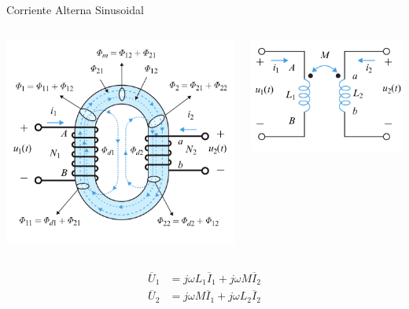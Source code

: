 \documentclass[xcolor={usenames,svgnames,dvipsnames}]{beamer}
\begin{document}
\begin{frame}[label={sec:org409ff05}]{Corriente Alterna Sinusoidal}
\begin{columns}
\begin{column}{0.5\columnwidth}
\begin{center}
\includegraphics[height=0.45\textheight]{figs/Acoplamiento1.png}
\end{center}
\end{column}

\begin{column}{0.5\columnwidth}
\begin{center}
\includegraphics[height=0.45\textheight]{figs/Acoplamiento1_circuito.png}
\end{center}
\end{column}
\end{columns}
\begin{align*}
  \overline{U}_1 &= j \omega L_1 \overline{I}_1 + j \omega M \overline{I}_2\\
  \overline{U}_2 &= j \omega M \overline{I}_1 + j \omega L_2 \overline{I}_2
\end{align*}
\end{frame}
\end{document}
